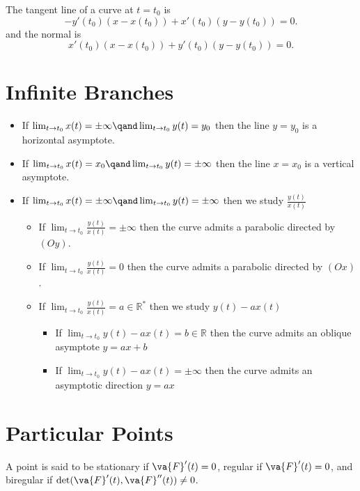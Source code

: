\begin{remark}
	The tangent line of a curve at $t=t_0$ is
	\[
		-y'(t_0)(x-x(t_0)) + x'(t_0)(y-y(t_0))=0
		.\]
	and the normal is
	\[
		x'(t_0)(x-x(t_0))+y'(t_0)(y-y(t_0))=0
		.\]
\end{remark}

\section{Infinite Branches}

\begin{itemize}
	\item If $\lim_{t \to t_0} x(t)= \pm \infty \qand \lim_{t \to t_0}y(t)=y_0$ then the line $y=y_0$ is a horizontal asymptote.
	\item If $\lim_{t \to t_0} x(t)= x_0 \qand \lim_{t \to t_0}y(t)=\pm \infty$ then the line $x=x_0$ is a vertical asymptote.
	\item If $\lim_{t \to t_0} x(t)= \pm \infty \qand \lim_{t \to t_0}y(t)=\pm \infty$ then we study $\frac{y(t)}{x(t)}$
	      \begin{itemize}
		      \item If $\lim_{t \to t_0}  \frac{y(t)}{x(t)}=\pm \infty$ then the curve admits a parabolic directed by $(Oy)$.
		      \item If $\lim_{t \to t_0}  \frac{y(t)}{x(t)}=0$ then the curve admits a parabolic directed by $(Ox)$.
		      \item If $\lim_{t \to t_0}  \frac{y(t)}{x(t)}=a\in \mathbb{R}^*$ then we study $y(t)-ax(t)$
		            \begin{itemize}
			            \item If $\lim_{t \to t_0} y(t)-ax(t)=b\in \mathbb{R} $ then the curve admits an oblique asymptote $y=ax+b$
			            \item If $\lim_{t \to t_0} y(t)-ax(t)=\pm \infty$ then the curve admits an asymptotic direction $y=ax$
		            \end{itemize}
	      \end{itemize}
\end{itemize}

\section{Particular Points}

A point is said to be stationary if $\va{F}'(t) = 0$, regular if $\va{F}'(t)=0$, and biregular if $\det(\va{F}'(t),\va{F}''(t))\neq 0$.\\

